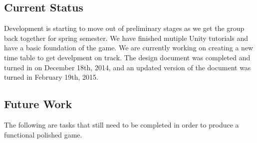 \documentclass[12pt]{article}       %
\begin{document}
\subsection{Current Status}

Development is starting to move out of preliminary stages as we get the group back together for spring semester. We have finished mutiple Unity tutorials and have a basic foundation of the game. We are currently working on creating a new time table to get develpment on track. The design document was completed and turned in on December 18th, 2014, and an updated version of the document was turned in February 19th, 2015. 

\subsection{Future Work}
The following are tasks that still need to be completed in order to produce a functional polished game.
\end{document}
